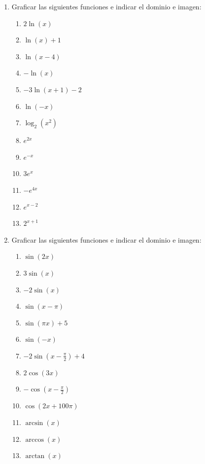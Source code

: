 \documentclass[a4paper]{article}
\newcommand{\exercise}{\item}
\begin{document}
\begin{enumerate}
\begin{enumerate} [label=(\alph*)]
		\item $2^x=10$
		\item $2\ln(x)=4$
		\item $e^{x^2+1}=\displaystyle{\frac{1}{e^2}}$
		\item $\ln(x)+\ln(x^2)=-\ln(6)$
	\end{enumerate}
	\exercise Graficar las siguientes funciones e indicar el dominio e imagen:
	\begin{multicols}{3}
	\begin{enumerate} [label=(\alph*)]
		\item $2\ln(x)$
		\item $\ln(x)+1$
		\item $\ln(x-4)$
		\item $-\ln(x)$
		\item $-3\ln(x+1)-2$
		\item $\ln(-x)$
		\item $\log_2(x^2)$
		\item $e^{2x}$
		\item $e^{-x}$
		\item $3e^{x}$
		\item $-e^{4x}$
		\item $e^{x-2}$
		\item $2^{x+1}$
	\end{enumerate}
	\end{multicols}
	\exercise Graficar las siguientes funciones e indicar el dominio e imagen:
	\begin{multicols}{3}
	\begin{enumerate} [label=(\alph*)]
		\item $\sin(2x)$
		\item $3\sin(x)$
		\item $-2\sin(x)$
		\item $\sin(x-\pi)$
		\item $\sin(\pi x)+5$
		\item $\sin(-x)$
		\item $-2\sin\left(x-\frac{\pi}{2}\right)+4$
		\item $2\cos(3x)$
		\item $-\cos\left(x-\frac{\pi}{2}\right)$
		\item $\cos(2x+100\pi)$
		\item $\arcsin(x)$
		\item $\arccos(x)$
		\item $\arctan(x)$
	\end{enumerate}
	\end{multicols}

\end{enumerate}
\end{document}
